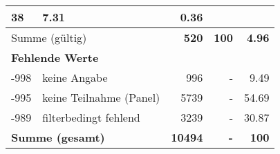 \begin{longtable}{lXrrr}
       \num{38} &
       \num[round-mode=places,round-precision=2]{7,31} &
         \num[round-mode=places,round-precision=2]{0,36} \\
     \midrule
     \multicolumn{2}{l}{Summe (gültig)} &
       \textbf{\num{520}} &
     \textbf{100} &
       \textbf{\num[round-mode=places,round-precision=2]{4,96}} \\
     \multicolumn{5}{l}{\textbf{Fehlende Werte}}\\
       -998 &
       keine Angabe &
         \num{996} &
        - &
         \num[round-mode=places,round-precision=2]{9,49} \\
       -995 &
       keine Teilnahme (Panel) &
         \num{5739} &
        - &
         \num[round-mode=places,round-precision=2]{54,69} \\
       -989 &
       filterbedingt fehlend &
         \num{3239} &
        - &
         \num[round-mode=places,round-precision=2]{30,87} \\
     \midrule
     \multicolumn{2}{l}{\textbf{Summe (gesamt)}} &
          \textbf{\num{10494}} &
        \textbf{-} &
        \textbf{100} \\
     \bottomrule
     \end{longtable}
     

